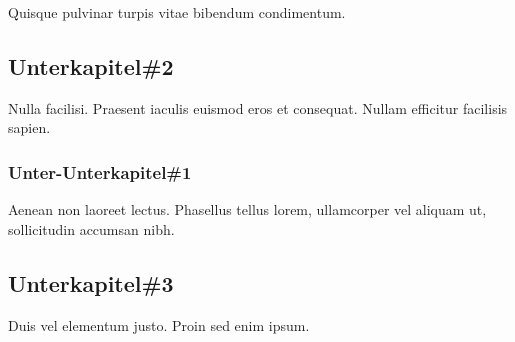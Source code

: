 Quisque pulvinar turpis vitae bibendum condimentum. 

\subsection{Unterkapitel\#2}

Nulla facilisi. Praesent iaculis euismod eros et consequat. Nullam efficitur facilisis sapien. 

\subsubsection{Unter-Unterkapitel\#1}

Aenean non laoreet lectus. Phasellus tellus lorem, ullamcorper vel aliquam ut, sollicitudin accumsan nibh. 

\subsection{Unterkapitel\#3}

Duis vel elementum justo. Proin sed enim ipsum. 
